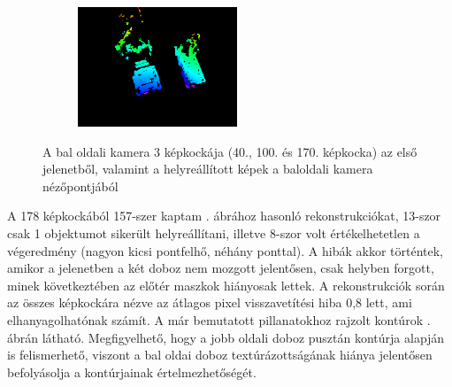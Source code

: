 \begin{figure}[tbh]
\begin{subfigure}[b]{.32\linewidth}
  \end{subfigure}
\begin{subfigure}[b]{.32\linewidth}
	\centering
	\includegraphics[width=135pt]{figures/vis_223.png}
  \end{subfigure}
\caption{A bal oldali kamera 3 képkockája (40., 100. és 170. képkocka) az első jelenetből, valamint a helyreállított képek a baloldali kamera nézőpontjából \label{fig:scene1_frames}}
\end{figure}

A 178 képkockából 157-szer kaptam . ábrához hasonló rekonstrukciókat, 13-szor csak 1 objektumot sikerült helyreállítani, illetve 8-szor volt értékelhetetlen a végeredmény (nagyon kicsi pontfelhő, néhány ponttal). A hibák akkor történtek, amikor a jelenetben a két doboz nem mozgott jelentősen, csak helyben forgott, minek következtében az előtér maszkok hiányosak lettek. A rekonstrukciók során az összes képkockára nézve az átlagos pixel visszavetítési hiba 0,8 lett, ami elhanyagolhatónak számít. A már bemutatott pillanatokhoz rajzolt kontúrok . ábrán látható. Megfigyelhető, hogy a jobb oldali doboz pusztán kontúrja alapján is felismerhető, viszont a bal oldai doboz textúrázottságának hiánya jelentősen befolyásolja a kontúrjainak értelmezhetőségét.

